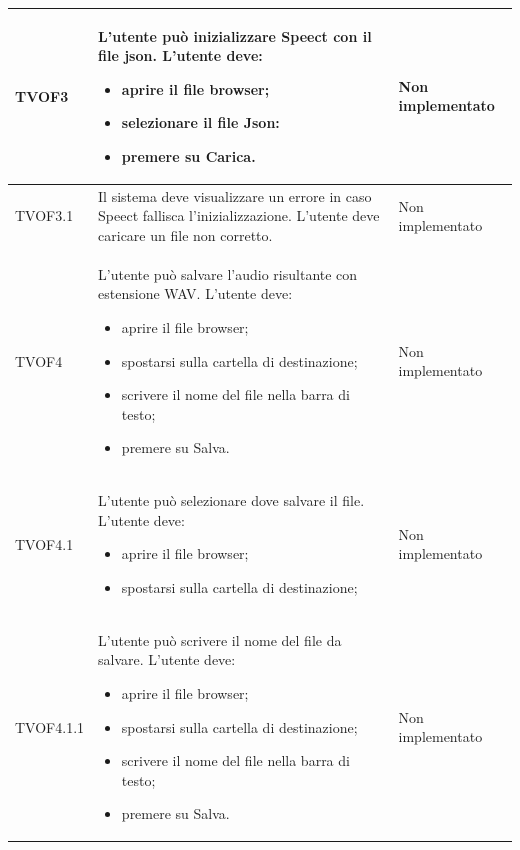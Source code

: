 \documentclass[openany,12pt,a4paper]{report}
\begin{document}
\begin{longtable}{| p{2cm} |p{5cm} | p{2.5cm} |}
	\newline TVOF3&		
	\newline L'utente può inizializzare Speect con il file json. L'utente deve:
	\begin{itemize}
		\item aprire il file browser;
		\item selezionare il file Json:
		\item premere su Carica.
	\end{itemize}&
	\newline Non implementato
	\\[1em]	
	\hline	
	
	\newline TVOF3.1&
	\newline Il sistema deve visualizzare un errore in caso Speect fallisca l'inizializzazione. L'utente deve caricare un file non corretto.&
	\newline Non implementato
	\\[1em]		
	\hline
	
	\newline TVOF4&
	\newline L'utente può salvare l'audio risultante con estensione WAV. L'utente deve:
	\begin{itemize}
		\item aprire il file browser;
		\item spostarsi sulla cartella di destinazione;
		\item scrivere il nome del file nella barra di testo;
		\item premere su Salva.
	\end{itemize}&
	\newline Non implementato
	\\[1em]
	\hline
	
	\newline TVOF4.1&
	\newline L'utente può selezionare dove salvare il file. L'utente deve:
	\begin{itemize}
		\item aprire il file browser;
		\item spostarsi sulla cartella di destinazione;
	\end{itemize}&
	\newline Non implementato
	\\[1em]
	
	\hline	
	\newline TVOF4.1.1&
	\newline L'utente può scrivere il nome del file da salvare. L'utente deve:
	\begin{itemize}
		\item aprire il file browser;
		\item spostarsi sulla cartella di destinazione;
		\item scrivere il nome del file nella barra di testo;
		\item premere su Salva.
	\end{itemize}&
	\newline Non implementato
	\\[1em]
	

\end{longtable}
\end{document}
